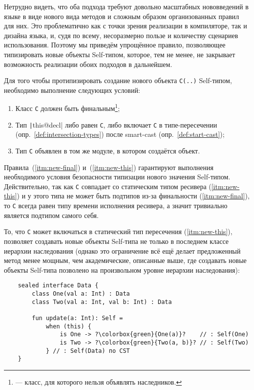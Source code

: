 Нетрудно видеть, что оба подхода требуют довольно масштабных нововведений в языке в виде нового вида методов и сложным образом организованных правил для них.
Это проблематично как с точки зрения реализации в компиляторе, так и дизайна языка, и, судя по всему, несоразмерно пользе и количеству сценариев использования.
Поэтому мы приведём упрощённое правило, позволяющее типизировать новые объекты Self-типом, которое, тем не менее, не закрывает возможность реализации обоих подходов в дальнейшем.

Для того чтобы протипизировать создание нового объекта \texttt{C(..)} Self-типом, необходимо выполнение следующих условий:

\begin{enumerate}
    \item \label{itm:new-final} Класс \texttt{C} должен быть финальным\footnote{ --- класс, для которого нельзя объявлять наследников.};
    \item \label{itm:new-this} Тип \texttt|this@decl| либо равен \texttt{С}, либо включает \texttt{C} в типе-пересечении (опр.~\ref{def:intersection-types}) после smart-cast (опр.~\ref{def:start-cast});
    \item \label{itm:new-module} Тип \texttt{C} объявлен в том же модуле, в котором создаётся объект.
\end{enumerate}

Правила~(\ref{itm:new-final}) и~(\ref{itm:new-this}) гарантируют выполнения необходимого условия безопасности типизации нового значения Self-типом.
Действительно, так как \texttt{C} совпадает со статическим типом ресивера (\ref{itm:new-this}) и у этого типа не может быть подтипов из-за финальности (\ref{itm:new-final}), то \texttt{C} всегда равен типу времени исполнения ресивера, а значит тривиально является подтипом самого себя.

То, что \texttt{C} может включаться в статический тип пересечения (\ref{itm:new-this}), позволяет создавать новые объекты Self-типа не только в последнем классе иерархии наследования (однако это ограничение всё ещё делает предложенный метод менее мощным, чем академические, описанные выше, где создавать новые объекты Self-типа позволено на произвольном уровне иерархии наследования):

\begin{verbatim}
    sealed interface Data {
        class One(val a: Int) : Data
        class Two(val a: Int, val b: Int) : Data

        fun update(a: Int): Self =
            when (this) {
                is One -> ?\colorbox{green}{One(a)}?    // : Self(One)
                is Two -> ?\colorbox{green}{Two(a, b)}? // : Self(Two)
            } // : Self(Data) по CST
    }
\end{verbatim}

